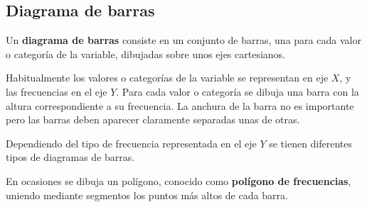 \documentclass[
  a4paper,
]{scrreport}
\theoremstyle{plain}
\theoremstyle{definition}
\theoremstyle{definition}
\theoremstyle{remark}
\begin{document}
\hypertarget{diagrama-de-barras}{%
\subsection{Diagrama de barras}\label{diagrama-de-barras}}

Un \textbf{diagrama de barras} consiste en un conjunto de barras, una
para cada valor o categoría de la variable, dibujadas sobre unos ejes
cartesianos.

Habitualmente los valores o categorías de la variable se representan en
eje \(X\), y las frecuencias en el eje \(Y\). Para cada valor o
categoría se dibuja una barra con la altura correspondiente a su
frecuencia. La anchura de la barra no es importante pero las barras
deben aparecer claramente separadas unas de otras.

Dependiendo del tipo de frecuencia representada en el eje \(Y\) se
tienen diferentes tipos de diagramas de barras.

En ocasiones se dibuja un polígono, conocido como \textbf{polígono de
frecuencias}, uniendo mediante segmentos los puntos más altos de cada
barra.
\end{document}
